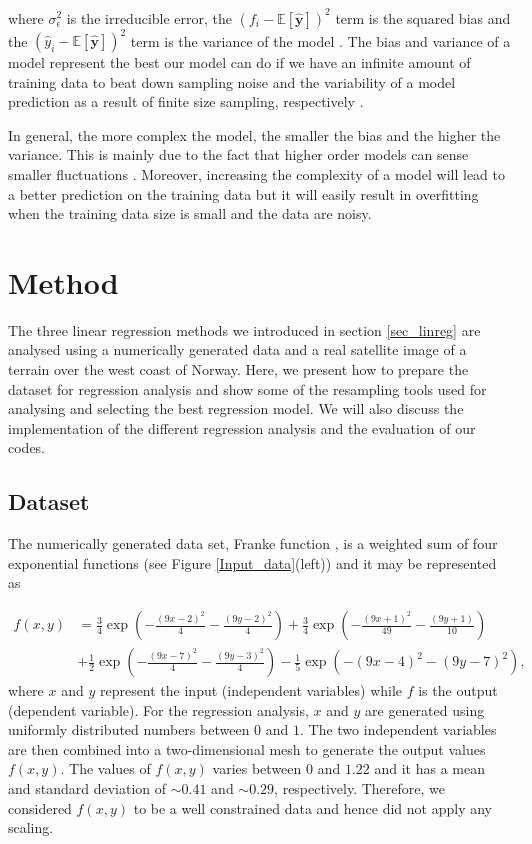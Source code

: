\documentclass[a4paper]{article}
\begin{document}
where $\sigma_{\epsilon}^2$ is the irreducible error,  the $(f_i-\mathbb{E}\left[\mathbf{\hat{y}}\right])^2$ term is the squared bias and the $(\hat{y}_i-\mathbb{E}\left[\mathbf{\hat{y}}\right])^2$ term is the variance of the model \cite{Pankaj}. The bias and variance of a model represent the best our model can do if we have an infinite amount of training data to beat down sampling noise and the variability of a model prediction as a result of finite size sampling, respectively \cite{Pankaj}. 

In general, the more complex the model, the smaller the bias and the higher the variance. This is mainly due to the fact that higher order models can sense smaller fluctuations \cite{lec}. Moreover, increasing the complexity of a model will lead to a better prediction on the training data but it will easily result in overfitting when the training data size is small and the data are noisy. 

\section{Method}
The three linear regression methods we introduced in section \ref{sec_linreg} are analysed using a numerically generated data and a real satellite image of a terrain over the west coast of Norway. Here, we present how to prepare the dataset for regression analysis and show some of the resampling tools used for analysing and selecting the best regression model. We will also discuss the implementation of the different regression analysis and the evaluation of our codes.

\subsection{Dataset}
The numerically generated data set, Franke function \cite{franke1979critical}, is a weighted sum of four exponential functions (see Figure \ref{Input_data}(left)) and it may be represented as 

\begin{align}
   f(x,y) &= \frac{3}{4}\exp{\left(-\frac{(9x-2)^2}{4}-\frac{(9y-2)^2}{4}\right)} 
   +\frac{3}{4}\exp{\left(-\frac{(9x+1)^2}{49}-\frac{(9y+1)}{10}\right)}\nonumber  \\ 
   &+\frac{1}{2}\exp{\left(-\frac{(9x-7)^2}{4} -\frac{(9y-3)^2}{4}\right)}-\frac{1}{5}\exp{\left(-(9x-4)^2 - (9y-7)^2\right)},
\end{align}
where $x$ and $y$ represent the input (independent variables) while $f$ is the output (dependent variable). For the regression analysis, $x$ and $y$ are generated using uniformly distributed numbers between $0$ and $1$. The two independent variables are then combined into a two-dimensional mesh to generate the output values $f(x,y)$. The values of $f(x,y)$ varies between $0$ and $1.22$ and it has a mean and standard deviation of $\sim0.41$ and $\sim0.29$, respectively. Therefore, we considered $f(x,y)$ to be a well constrained data and hence did not apply any scaling.
\end{document}
